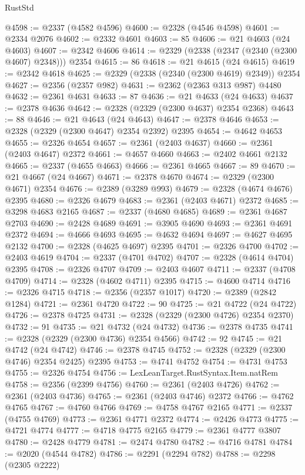 \begin{lexlean}{RustStd}
\begin{coremodule}
@4598 := @2337 (@4582 @4596)
@4600 := @2328 (@4546 @4598)
@4601 := @2334 @2076
@4602 := @2332 @4601
@4603 := 85
@4606 := @21 @4603 (@24 @4603)
@4607 := @2342 @4606
@4614 := @2329 (@2338 (@2347 (@2340 (@2300 @4607) @2348))) @2354
@4615 := 86
@4618 := @21 @4615 (@24 @4615)
@4619 := @2342 @4618
@4625 := @2329 (@2338 (@2340 (@2300 @4619) @2349)) @2354
@4627 := @2356 (@2357 @982)
@4631 := @2362 (@2363 @313 @987) @4480
@4632 := @2361 @4631
@4633 := 87
@4636 := @21 @4633 (@24 @4633)
@4637 := @2378 @4636
@4642 := @2328 (@2329 (@2300 @4637) @2354 @2368)
@4643 := 88
@4646 := @21 @4643 (@24 @4643)
@4647 := @2378 @4646
@4653 := @2328 (@2329 (@2300 @4647) @2354 @2392) @2395
@4654 := @4642 @4653
@4655 := @2326 @4654
@4657 := @2361 (@2403 @4637)
@4660 := @2361 (@2403 @4647) @2372
@4661 := @4657 @4660
@4663 := @2402 @4661 @2132
@4665 := @2337 (@4655 @4663)
@4666 := @2361 @4665
@4667 := 89
@4670 := @21 @4667 (@24 @4667)
@4671 := @2378 @4670
@4674 := @2329 (@2300 @4671) @2354
@4676 := @2389 (@3289 @993)
@4679 := @2328 (@4674 @4676) @2395
@4680 := @2326 @4679
@4683 := @2361 (@2403 @4671) @2372
@4685 := @3298 @4683 @2165
@4687 := @2337 (@4680 @4685)
@4689 := @2361 @4687 @2703
@4690 := @2428 @4689
@4691 := @3905 @4690
@4693 := @2361 @4691 @2372
@4694 := @4666 @4693
@4695 := @4632 @4694
@4697 := @4627 @4695 @2132
@4700 := @2328 (@4625 @4697) @2395
@4701 := @2326 @4700
@4702 := @2403 @4619
@4704 := @2337 (@4701 @4702)
@4707 := @2328 (@4614 @4704) @2395
@4708 := @2326 @4707
@4709 := @2403 @4607
@4711 := @2337 (@4708 @4709)
@4714 := @2328 (@4602 @4711) @2395
@4715 := @4600 @4714
@4716 := @2326 @4715
@4718 := @2356 (@2357 @1017)
@4720 := @2389 (@2842 @1284)
@4721 := @2361 @4720
@4722 := 90
@4725 := @21 @4722 (@24 @4722)
@4726 := @2378 @4725
@4731 := @2328 (@2329 (@2300 @4726) @2354 @2370)
@4732 := 91
@4735 := @21 @4732 (@24 @4732)
@4736 := @2378 @4735
@4741 := @2328 (@2329 (@2300 @4736) @2354 @4566)
@4742 := 92
@4745 := @21 @4742 (@24 @4742)
@4746 := @2378 @4745
@4752 := @2328 (@2329 (@2300 @4746) @2354 @2425) @2395
@4753 := @4741 @4752
@4754 := @4731 @4753
@4755 := @2326 @4754
@4756 := LexLeanTarget.RustSyntax.Item.natRem
@4758 := @2356 (@2399 @4756)
@4760 := @2361 (@2403 @4726)
@4762 := @2361 (@2403 @4736)
@4765 := @2361 (@2403 @4746) @2372
@4766 := @4762 @4765
@4767 := @4760 @4766
@4769 := @4758 @4767 @2165
@4771 := @2337 (@4755 @4769)
@4773 := @2361 @4771 @2372
@4774 := @2426 @4773
@4775 := @4721 @4774
@4777 := @4718 @4775 @2165
@4779 := @2361 @4777 @3807
@4780 := @2428 @4779
@4781 := @2474 @4780
@4782 := @4716 @4781
@4784 := @2020 (@4544 @4782)
@4786 := @2291 (@2294 @782)
@4788 := @2298 (@2305 @2222)

\end{coremodule}
\end{lexlean}
